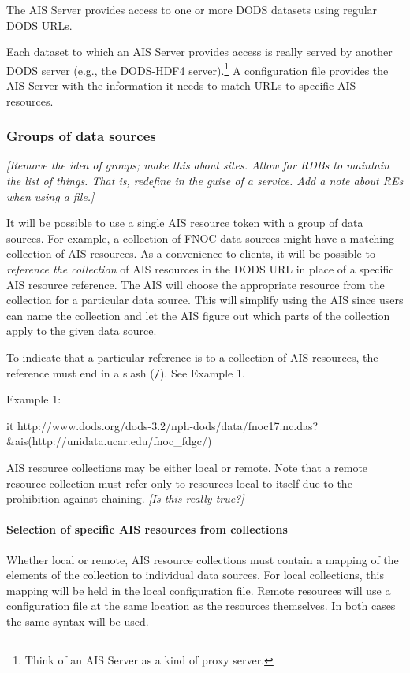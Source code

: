 \documentclass{article}
\begin{document}
The \ac{AIS} Server provides access to one or more DODS datasets using
regular DODS URLs. 

Each dataset to which an \ac{AIS} Server provides access is really served by
another DODS server (e.g., the DODS-HDF4 server).\footnote{Think of an AIS
  Server as a kind of proxy server.} A configuration file provides the
\ac{AIS} Server with the information it needs to match URLs to specific
\ac{AIS} resources. 

\subsubsection{Groups of data sources}
\label{sec:groups}
\emph{[Remove the idea of groups; make this about sites. Allow for RDBs to
  maintain the list of things. That is, redefine in the guise of a service.
  Add a note about REs when using a file.]}

It will be possible to use a single \ac{AIS} resource token with a group of
data sources. For example, a collection of FNOC data sources might have a
matching collection of \ac{AIS} resources. As a convenience to clients, it
will be possible to \emph{reference the collection} of \ac{AIS} resources in
the \ac{DODS} \ac{URL} in place of a specific \ac{AIS} resource reference.
The \ac{AIS} will choose the appropriate resource from the collection for a
particular data source. \cbstart This will simplify using the \ac{AIS} since
users can name the collection and let the \ac{AIS} figure out which parts of
the collection apply to the given data source. \cbend

To indicate that a particular reference is to a collection of \ac{AIS}
resources, the reference must end in a slash (\texttt{/}). See Example 1.

Example 1:\\
\begin{vcode}{it}
http://www.dods.org/dods-3.2/nph-dods/data/fnoc17.nc.das?
&ais(http://unidata.ucar.edu/fnoc_fdgc/)
\end{vcode}

\acl{AIS} resource collections may be either local or remote. Note
that a remote resource collection must refer only to resources local
to itself due to the prohibition against chaining. \emph{[Is this
really true?]}

\paragraph{Selection of specific \ac{AIS} resources from collections}
Whether local or remote, \ac{AIS} resource collections must contain a
mapping of the elements of the collection to individual data
sources. For local collections, this mapping will be held in the local
configuration file. Remote resources will use a configuration file at
the same location as the resources themselves. In both cases the same
syntax will be used.
\end{document}
